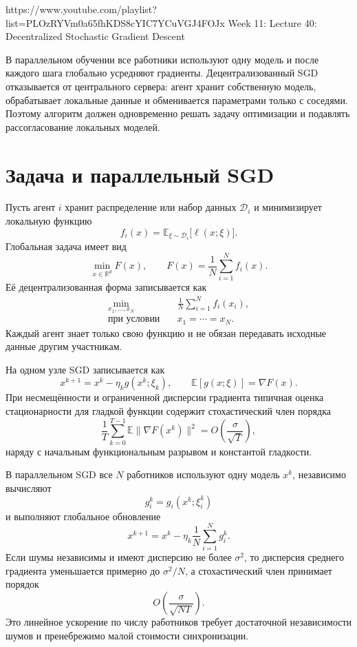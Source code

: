 
\sourcevideo
    {https://www.youtube.com/playlist?list=PLOzRYVm0a65fhKDS8cYIC7YCuVGJ4FOJx}
    {Week 11: Lecture 40: Decentralized Stochastic Gradient Descent}

В параллельном обучении все работники используют одну модель и после
каждого шага глобально усредняют градиенты. Децентрализованный SGD
отказывается от центрального сервера: агент хранит собственную модель,
обрабатывает локальные данные и обменивается параметрами только с
соседями. Поэтому алгоритм должен одновременно решать задачу
оптимизации и подавлять рассогласование локальных моделей.

\section{Задача и параллельный SGD}

Пусть агент \(i\) хранит распределение или набор данных
\(\mathcal D_i\) и минимизирует локальную функцию
\[
    f_i(x)
    =
    \mathbb E_{\xi\sim\mathcal D_i}
    \bigl[\ell(x;\xi)\bigr].
\]
Глобальная задача имеет вид
\[
    \min_{x\in\mathbb R^d}F(x),
    \qquad
    F(x)=\frac1N\sum_{i=1}^{N}f_i(x).
\]
Её децентрализованная форма записывается как
\[
\begin{aligned}
    \min_{x_1,\ldots,x_N}\quad
    &\frac1N\sum_{i=1}^{N}f_i(x_i),
    \\
    \text{при условии}\quad
    &x_1=\cdots=x_N.
\end{aligned}
\]
Каждый агент знает только свою функцию и не обязан передавать
исходные данные другим участникам.

На одном узле SGD записывается как
\[
    x^{k+1}=x^k-\eta_k g(x^k;\xi_k),
    \qquad
    \mathbb E[g(x;\xi)]=\nabla F(x).
\]
При несмещённости и ограниченной дисперсии градиента типичная оценка
стационарности для гладкой функции содержит стохастический член
порядка
\[
    \frac1T\sum_{k=0}^{T-1}
    \mathbb E\lVert\nabla F(x^k)\rVert^2
    =
    O\!\left(
        \frac{\sigma}{\sqrt T}
    \right),
\]
наряду с начальным функциональным разрывом и константой гладкости.

В параллельном SGD все \(N\) работников используют одну модель
\(x^k\), независимо вычисляют
\[
    g_i^k=g_i(x^k;\xi_i^k)
\]
и выполняют глобальное обновление
\[
    x^{k+1}
    =
    x^k-
    \eta_k\frac1N\sum_{i=1}^{N}g_i^k.
\]
Если шумы независимы и имеют дисперсию не более \(\sigma^2\), то
дисперсия среднего градиента уменьшается примерно до
\(\sigma^2/N\), а стохастический член принимает порядок
\[
    O\!\left(
        \frac{\sigma}{\sqrt{NT}}
    \right).
\]
Это линейное ускорение по числу работников требует достаточной
независимости шумов и пренебрежимо малой стоимости синхронизации.

